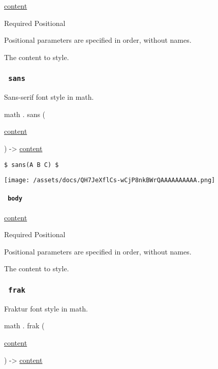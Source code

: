 \href{/docs/reference/foundations/content/}{content}

{Required} {{ Positional }}

\label{functions-serif-body-positional-tooltip}
Positional parameters are specified in order, without names.

The content to style.

\subsubsection{\texorpdfstring{\texttt{\ sans\ }}{ sans }}\label{functions-sans}

Sans-serif font style in math.

math { . } { sans } (

{ \href{/docs/reference/foundations/content/}{content} }

) -\textgreater{} \href{/docs/reference/foundations/content/}{content}

\begin{verbatim}
$ sans(A B C) $
\end{verbatim}

\texttt{[image: /assets/docs/QH7JeXflCs-wCjP8nkBWrQAAAAAAAAAA.png]}

\paragraph{\texorpdfstring{\texttt{\ body\ }}{ body }}\label{functions-sans-body}

\href{/docs/reference/foundations/content/}{content}

{Required} {{ Positional }}

\label{functions-sans-body-positional-tooltip}
Positional parameters are specified in order, without names.

The content to style.

\subsubsection{\texorpdfstring{\texttt{\ frak\ }}{ frak }}\label{functions-frak}

Fraktur font style in math.

math { . } { frak } (

{ \href{/docs/reference/foundations/content/}{content} }

) -\textgreater{} \href{/docs/reference/foundations/content/}{content}

